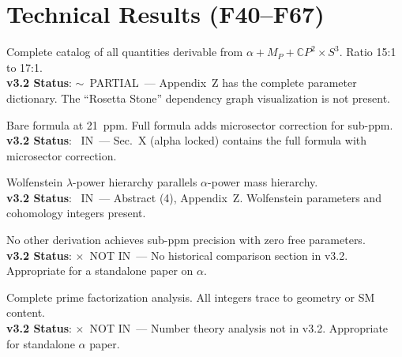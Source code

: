 \documentclass[11pt,a4paper]{article}
\newcommand{\vin}{\textcolor{statusIN}{\checkmark~IN}}
\newcommand{\vpartial}{\textcolor{statusPARTIAL}{$\sim$~PARTIAL}}
\newcommand{\vnot}{\textcolor{statusNOT}{$\times$~NOT IN}}
\begin{document}
\section{Technical Results (F40--F67)}\label{sec:technical}

\begin{tcolorbox}[colback=technical!5,colframe=technical,title=\textbf{F40: 45-Prediction Rosetta Stone Web}]
Complete catalog of all quantities derivable from $\alpha + M_P + \mathbb{C}P^2 \times S^3$. Ratio 15:1 to 17:1.\\
\textbf{v3.2 Status}: \vpartial\ --- Appendix~Z has the complete parameter dictionary. The ``Rosetta Stone'' dependency graph visualization is not present.
\end{tcolorbox}

\begin{tcolorbox}[colback=technical!5,colframe=technical,title=\textbf{F41: ``$E = mc^2$'' Form of $\alpha$: $\alpha^{-1} = 5^2 \pi^{3/2} (1-2^{-6})$}]
Bare formula at 21~ppm. Full formula adds microsector correction for sub-ppm.\\
\textbf{v3.2 Status}: \vin\ --- Sec.~X (alpha locked) contains the full formula with microsector correction.
\end{tcolorbox}

\begin{tcolorbox}[colback=technical!5,colframe=technical,title=\textbf{F42: CKM--$\alpha$ Structural Connection}]
Wolfenstein $\lambda$-power hierarchy parallels $\alpha$-power mass hierarchy.\\
\textbf{v3.2 Status}: \vin\ --- Abstract (4), Appendix~Z. Wolfenstein parameters and cohomology integers present.
\end{tcolorbox}

\begin{tcolorbox}[colback=technical!5,colframe=technical,title=\textbf{F43: Historical Comparison --- DFD Unique Among All $\alpha$ Derivations}]
No other derivation achieves sub-ppm precision with zero free parameters.\\
\textbf{v3.2 Status}: \vnot\ --- No historical comparison section in v3.2. Appropriate for a standalone paper on $\alpha$.
\end{tcolorbox}

\begin{tcolorbox}[colback=technical!5,colframe=technical,title=\textbf{F44: Number-Theoretic Properties of the $\alpha$ Formula}]
Complete prime factorization analysis. All integers trace to geometry or SM content.\\
\textbf{v3.2 Status}: \vnot\ --- Number theory analysis not in v3.2. Appropriate for standalone $\alpha$ paper.
\end{tcolorbox}
\end{document}
